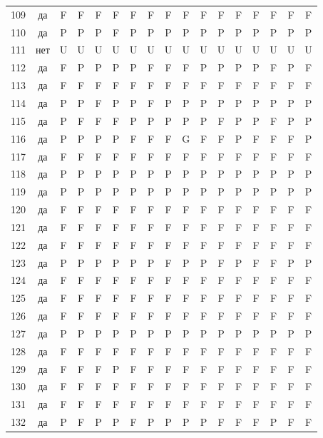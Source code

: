 \begin{table}[p]
\begin{tabular*}{\textwidth}{@{\extracolsep{\fill}}rcccccccccccccccc}
109 & да & F & F & F & F & F & F & F & F & F & F & F & F & F & F & F\\
110 & да & P & P & P & F & P & P & P & P & P & P & P & P & P & P & P\\
111 & нет & U & U & U & U & U & U & U & U & U & U & U & U & U & U & U\\
112 & да & F & P & P & P & P & F & F & F & P & P & P & P & F & P & F\\
113 & да & F & F & F & F & F & F & F & F & F & F & F & F & F & F & F\\
114 & да & P & P & F & P & P & F & P & P & P & P & P & P & P & P & P\\
115 & да & P & F & F & F & P & P & P & P & P & F & P & P & F & P & P\\
116 & да & P & P & P & P & F & F & F & G & F & F & P & F & F & F & P\\
117 & да & F & F & F & F & F & F & F & F & F & F & F & F & F & F & F\\
118 & да & P & P & P & P & P & P & P & P & P & P & P & P & P & P & P\\
119 & да & P & P & P & P & P & P & P & P & P & P & P & P & P & P & P\\
120 & да & F & F & F & F & F & F & F & F & F & F & F & F & F & F & F\\
121 & да & F & F & F & F & F & F & F & F & F & F & F & F & F & F & F\\
122 & да & F & F & F & F & F & F & F & F & F & F & F & F & F & F & F\\
123 & да & P & P & P & P & P & P & F & P & P & F & P & F & F & P & P\\
124 & да & F & F & F & F & F & F & F & F & F & F & F & F & F & F & F\\
125 & да & F & F & F & F & F & F & F & F & F & F & F & F & F & F & F\\
126 & да & F & F & F & F & F & F & F & F & F & F & F & F & F & F & F\\
127 & да & P & P & P & P & P & P & P & P & P & P & P & P & P & P & P\\
128 & да & F & F & F & F & F & F & F & F & F & F & F & F & F & F & F\\
129 & да & F & F & F & P & F & F & F & F & F & F & F & F & F & F & F\\
130 & да & F & F & F & F & F & F & F & F & F & F & F & F & F & F & F\\
131 & да & F & F & F & F & F & F & F & F & F & F & F & F & F & F & F\\
132 & да & P & F & P & P & F & P & P & P & P & F & F & F & P & F & F\\
\bottomrule\end{tabular*}\end{table}
\clearpage

